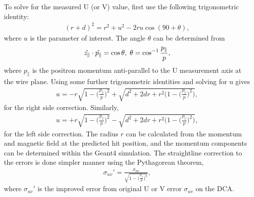 To solve for the measured U (or V) value, first use the following trigonometric identity:
	\begin{align}
		(r+d)^{2} = r^{2}+u^{2}-2ru\cos(90+\theta),
	\end{align}
where $u$ is the parameter of interest. The angle $\theta$ can be determined from 
	\begin{align}
		\hat{z_{\parallel}} \cdot \hat{p_{\parallel}} = \cos{\theta}, \hspace{.1cm} \theta = \cos^{-1}{\frac{p_{\parallel}}{p}}, 
	\end{align}
where $p_{\parallel}$ is the positron momentum anti-parallel to the U measurement axis at the wire plane. Using some further trigonometric identities and solving for u gives
	\begin{align}
		u = -r\sqrt{1-\Big(\frac{p_{\parallel}}{p}\Big)^{2}} + \sqrt{d^{2} + 2dr + r^{2}\Big(1-\Big(\frac{p_{\parallel}}{p}\Big)^{2}\Big)},
	\end{align}
for the right side correction. Similarly,  
	\begin{align}
		u = +r\sqrt{1-\Big(\frac{p_{\parallel}}{p}\Big)^{2}} - \sqrt{d^{2} + 2dr + r^{2}\Big(1-\Big(\frac{p_{\parallel}}{p}\Big)^{2}\Big)},
	\end{align}
for the left side correction. The radius $r$ can be calculated from the momentum and magnetic field at the predicted hit position, and the momentum components can be determined within the Geant4 simulation. The straightline correction to the errors is done simpler manner using the Pythagorean theorem, 
	\begin{align}
		\sigma_{uv}' = \frac{\sigma_{uv}}{\sqrt{1-\big(\frac{p_{\parallel}}{p}\big)^{2}}},
	\end{align}
where $\sigma_{uv}'$ is the improved error from original U or V error $\sigma_{uv}$ on the DCA.
